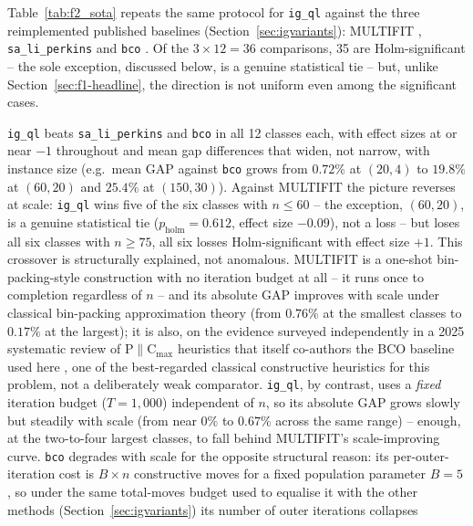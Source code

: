 \documentclass[final,3p,times,11pt,authoryear]{elsarticle}
\begin{document}
Table~\ref{tab:f2_sota} repeats the same protocol for \texttt{ig\_ql}
against the three reimplemented published baselines
(Section~\ref{sec:igvariants}): MULTIFIT \citep{CoffmanGareyJohnson1978},
\texttt{sa\_li\_perkins} \citep{LiPerkins2024} and \texttt{bco}
\citep{DavidovicEtal2012}. Of the $3 \times 12 = 36$ comparisons, 35
are Holm-significant -- the sole exception, discussed below, is a
genuine statistical tie -- but, unlike Section~\ref{sec:f1-headline},
the direction is not uniform even among the significant cases.



\texttt{ig\_ql} beats \texttt{sa\_li\_perkins} and \texttt{bco} in all
12 classes each, with effect sizes at or near $-1$ throughout and mean
gap differences that widen, not narrow, with instance size (e.g.\ mean
GAP against \texttt{bco} grows from $0.72\%$ at $(20,4)$ to $19.8\%$ at
$(60,20)$ and $25.4\%$ at $(150,30)$). Against MULTIFIT the picture
reverses at scale: \texttt{ig\_ql} wins five of the six classes with
$n \le 60$ -- the exception, $(60,20)$, is a genuine statistical tie
($p_{\mathrm{holm}}=0.612$, effect size $-0.09$), not a loss -- but
loses all six classes with $n \ge 75$, all six losses Holm-significant
with effect size $+1$. This crossover is structurally explained, not
anomalous. MULTIFIT is a one-shot bin-packing-style
construction with no iteration budget at all -- it runs once to
completion regardless of $n$ -- and its absolute GAP improves with
scale under classical bin-packing approximation theory (from
$0.76\%$ at the smallest classes to $0.17\%$ at the largest); it is
also, on the evidence surveyed independently in a 2025 systematic
review of P$\|$C$_{\max}$ heuristics that itself co-authors the BCO
baseline used here \citep[Section~5]{OstojicEtAl2025}, one of the
best-regarded classical constructive heuristics for this problem, not
a deliberately weak comparator. \texttt{ig\_ql}, by contrast, uses a
\emph{fixed} iteration budget ($T=1{,}000$) independent of $n$, so its
absolute GAP grows slowly but steadily with scale (from near $0\%$ to
$0.67\%$ across the same range) -- enough, at the two-to-four largest
classes, to fall behind MULTIFIT's scale-improving curve. \texttt{bco}
degrades with scale for the opposite structural reason: its per-outer-%
iteration cost is $B \times n$ constructive moves for a fixed
population parameter $B=5$ \citep{DavidovicEtal2012}, so under the
same total-moves budget used to equalise it with the other methods
(Section~\ref{sec:igvariants}) its number of outer iterations collapses
\end{document}

